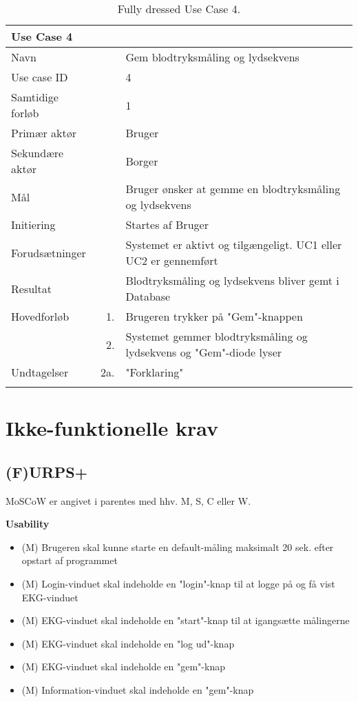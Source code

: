 \begin{longtabu} to  %
    {\large \textbf{Use Case 4}} && \\
    \toprule
    Navn &&    Gem blodtryksmåling og lydsekvens\\
    Use case ID &&    4\\
    Samtidige forløb &&    1\\
    Primær aktør &&    Bruger\\
    Sekundære aktør &&	Borger \\
    Mål &&    Bruger ønsker at gemme en blodtryksmåling og lydsekvens\\
    Initiering &&	Startes af Bruger\\
    Forudsætninger &&  Systemet er aktivt og tilgængeligt. UC1 eller UC2 er gennemført  \\
    Resultat &&   Blodtryksmåling og lydsekvens bliver gemt i Database  \\ \midrule
    Hovedforløb &    1. &    Brugeren trykker på "Gem"\--knappen \\[-1ex]	
                &    2. &    Systemet gemmer blodtryksmåling og lydsekvens og 		 "Gem"\--diode lyser\\ \midrule
                
    Undtagelser &    2a. &    "Forklaring" \\ \bottomrule
\caption{Fully dressed Use Case 4.}
\label{UC4}
\end{longtabu}


\section{Ikke-funktionelle krav}


\subsection{(F)URPS+}
MoSCoW er angivet i parentes med hhv. M, S, C eller W.

\textbf{Usability}
\begin{itemize}
	\item (M) Brugeren skal kunne starte en default-måling maksimalt 20 sek. efter opstart af programmet
	\item (M) Login-vinduet skal indeholde en "login"\--knap til at logge på og få vist EKG-vinduet
	\item (M) EKG-vinduet skal indeholde en "start"\--knap til at igangsætte målingerne
	\item (M) EKG-vinduet skal indeholde en "log ud"\--knap
	\item (M) EKG-vinduet  skal indeholde en "gem"\--knap
	\item (M) Information-vinduet skal indeholde en "gem"\--knap
\end{itemize}

